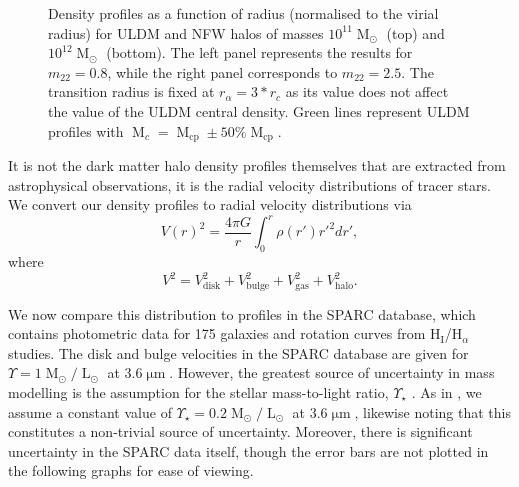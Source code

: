 \documentclass[a4paper,11pt]{article}
\begin{document}
\begin{figure}
\begin{tabular}{cc}
\end{tabular}
\caption{Density profiles as a function of radius (normalised to the virial radius) for ULDM and NFW halos of masses $10^{11}\operatorname{M}_{\odot}$ (top) and $10^{12}\operatorname{M}_{\odot}$ (bottom). The left panel represents the results for $m_{22} = 0.8$, while the right panel corresponds to $m_{22}=2.5$. The transition radius is fixed at $r_{\alpha} = 3*r_c$ as its value does not affect the value of the ULDM central density. Green lines represent  ULDM profiles with $\operatorname{M}_c = \operatorname{M}_{\mathrm{cp}} \pm 50 \% \operatorname{M}_{\mathrm{cp}}$.}\label{fig:profiles}
\end{figure}

It is not the dark matter halo density profiles themselves that are extracted from astrophysical observations, it is the radial velocity distributions of tracer stars. We convert our density profiles to radial velocity distributions \cite{Sofue:2008wt} via 
%
\begin{equation}
    V(r)^2 = \frac{4\pi G}{r}\int_0^r \rho(r')r'^2 dr',
\end{equation}
where 
\begin{equation}
    V^2 = V_{\mathrm{disk}}^2 + V_{\mathrm{bulge}}^2 + V_{\mathrm{gas}}^2 + V_{\mathrm{halo}}^2.
\end{equation}
%


We now compare this distribution to profiles in the SPARC database, which contains photometric data for 175 galaxies and rotation curves from $\mathrm{H}_{\mathrm{I}}$/$\mathrm{H}_{\alpha}$ studies. The disk and bulge velocities in the SPARC database are given for $\Upsilon = 1 \operatorname{M}_{\odot}/\operatorname{L}_{\odot}$ at $3.6\operatorname{\mu m}$. However, the greatest source of uncertainty in mass modelling is the assumption for the stellar mass-to-light ratio, $\Upsilon_\star$ \cite{Lelli:2016zqa}. As in \cite{Robles:2018fur}, we  assume a constant value of $\Upsilon_\star = 0.2 \operatorname{M}_{\odot}/\operatorname{L}_{\odot}$ at $3.6\operatorname{\mu m}$, likewise noting that  this constitutes a non-trivial source of uncertainty. Moreover, there is significant uncertainty in the SPARC data itself, though the error bars are not plotted in the following graphs for ease of viewing. 
\end{document}
